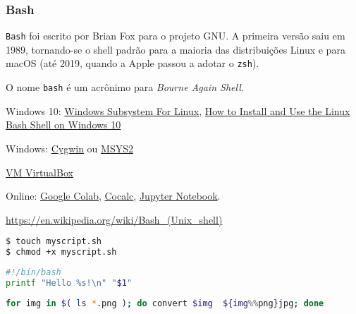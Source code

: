 \begin{frame}
\frametitle{Bash}
\texttt{Bash} foi escrito por Brian Fox para o projeto GNU. A primeira versão saiu em 1989, tornando-se o shell padrão 
para a maioria das distribuições Linux e para macOS (até 2019, quando a Apple passou a adotar o \texttt{zsh}).

\vspace{2ex}
O nome \texttt{bash} é um acrônimo para \emph{Bourne Again Shell}.


\vspace{2ex}
Windows 10: \href{https://blogs.windows.com/buildingapps/2016/03/30/run-bash-on-ubuntu-on-windows/}{Windows Subsystem For Linux},
\href{https://www.howtogeek.com/249966/how-to-install-and-use-the-linux-bash-shell-on-windows-10/}{How to Install and Use the Linux Bash Shell on Windows 10}

Windows: \href{https://www.cygwin.com/}{Cygwin} ou \href{https://www.msys2.org/}{MSYS2}


\href{https://www.virtualbox.org/}{VM VirtualBox}

Online: 
\href{https://colab.research.google.com}{Google Colab},
\href{https://cocalc.com}{Cocalc},
\href{https://jupyter.org/}{Jupyter Notebook}.

\vspace{2ex}
\url{https://en.wikipedia.org/wiki/Bash_(Unix_shell)}


\framebreak

\begin{lstlisting}[language=bash, label=lst-bash-new-script-01, caption={Criando um script.}, postbreak=\mbox{$\hookrightarrow$\space}, basicstyle=\fontsize{8}{10}\selectfont\ttfamily]
$ touch myscript.sh
$ chmod +x myscript.sh
\end{lstlisting}

\begin{lstlisting}[language=bash, label=lst-bash-new-script-02, caption={Criando um script.}, postbreak=\mbox{$\hookrightarrow$\space}, basicstyle=\fontsize{8}{10}\selectfont\ttfamily]
#!/bin/bash
printf "Hello %s!\n" "$1"
\end{lstlisting}

\begin{lstlisting}[language=bash, label=lst-bash-convert-imgs, caption={Script para converter PNGs em JPGs}, postbreak=\mbox{$\hookrightarrow$\space}, basicstyle=\fontsize{8}{10}\selectfont\ttfamily]
for img in $( ls *.png ); do convert $img  ${img%%png}jpg; done
\end{lstlisting}


\end{frame}
